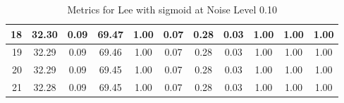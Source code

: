 \begin{table}[htb]
\begin{tabular}{|r|cccccccccc|}
      18 &  32.30 &  0.09 &  69.47 &  1.00 &  0.07 &  0.28 &  0.03 &  1.00 &  1.00 &  1.00  \\ \hline 
      19 &  32.29 &  0.09 &  69.46 &  1.00 &  0.07 &  0.28 &  0.03 &  1.00 &  1.00 &  1.00  \\ \hline 
      20 &  32.29 &  0.09 &  69.45 &  1.00 &  0.07 &  0.28 &  0.03 &  1.00 &  1.00 &  1.00  \\ \hline 
      21 &  32.28 &  0.09 &  69.45 &  1.00 &  0.07 &  0.28 &  0.03 &  1.00 &  1.00 &  1.00  \\ \hline 
    \end{tabular}
    \caption{Metrics for Lee with sigmoid at Noise Level 0.10}
    \end{table}


